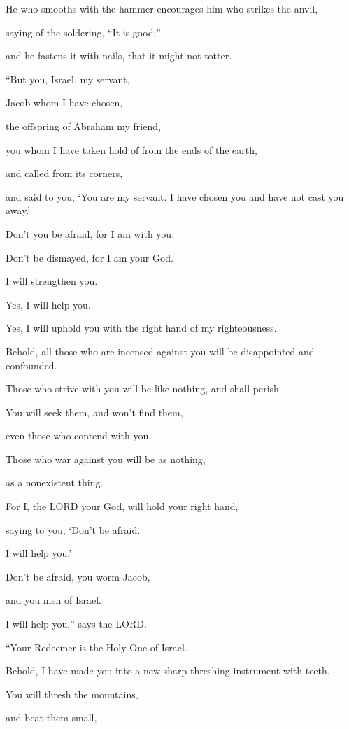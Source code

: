 He who smooths with the hammer encourages him who strikes the anvil,

saying of the soldering, “It is good;”

and he fastens it with nails, that it might not totter.


\vspace{\baselineskip} \myverse{}“But you, Israel, my servant,

Jacob whom I have chosen,

the offspring of Abraham my friend,

\myverse{}you whom I have taken hold of from the ends of the
earth,

and called from its corners,

and said to you, ‘You are my servant. I have chosen you and have not cast you
away.’

\myverse{}Don’t you be afraid, for I am with you.

Don’t be dismayed, for I am your God.

I will strengthen you.

Yes, I will help you.

Yes, I will uphold you with the right hand of my righteousness.

\myverse{}Behold, all those who are incensed against you will be disappointed
and confounded.

Those who strive with you will be like nothing, and shall perish.

\myverse{}You will seek them, and won’t find them,

even those who contend with you.

Those who war against you will be as nothing,

as a nonexistent thing.

\myverse{}For I, the LORD your God, will hold your right hand,

saying to you, ‘Don’t be afraid.

I will help you.’

\myverse{}Don’t be afraid, you worm Jacob,

and you men of Israel.

I will help you,” says the LORD.

“Your Redeemer is the Holy One of Israel.

\myverse{}Behold, I have made you into a new sharp threshing instrument
with teeth.

You will thresh the mountains,

and beat them small,

